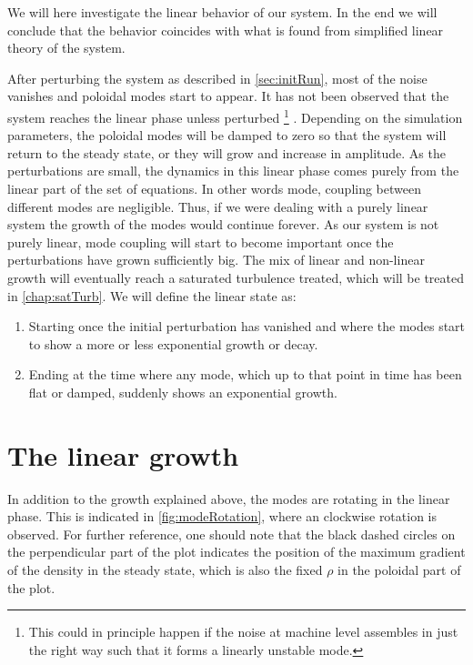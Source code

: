 %
We will here investigate the linear behavior of our system.
In the end we will conclude that the behavior coincides with what is found from simplified linear theory of the system.

After perturbing the system as described in \cref{sec:initRun}, most of the noise vanishes and poloidal modes start to appear.
It has not been observed that the system reaches the linear phase unless perturbed%
\footnote{This could in principle happen if the noise at machine level assembles in just the right way such that it forms a linearly unstable mode.}%
%
.
Depending on the simulation parameters, the poloidal modes will be damped to zero so that the system will return to the steady state, or they will grow and increase in amplitude.
As the perturbations are small, the dynamics in this linear phase comes purely from the linear part of the set of equations.
In other words mode, coupling between different modes are negligible.
Thus, if we were dealing with a purely linear system the growth of the modes would continue forever.
As our system is not purely linear, mode coupling will start to become important once the perturbations have grown sufficiently big.
The mix of linear and non-linear growth will eventually reach a saturated turbulence treated, which will be treated in \cref{chap:satTurb}.
We will define the linear state as:
%
\begin{enumerate}[noitemsep]
    \item Starting once the initial perturbation has vanished and where the modes start to show a more or less exponential growth or decay.
    \item Ending at the time where any mode, which up to that point in time has been flat or damped, suddenly shows an exponential growth.
\end{enumerate}
%

\section{The linear growth}
%
In addition to the growth explained above, the modes are rotating in the linear phase.
This is indicated in \cref{fig:modeRotation}, where an clockwise rotation is observed.
For further reference, one should note that the black dashed circles on the perpendicular part of the plot indicates the position of the maximum gradient of the density in the steady state, which is also the fixed $\rho$ in the poloidal part of the plot.

